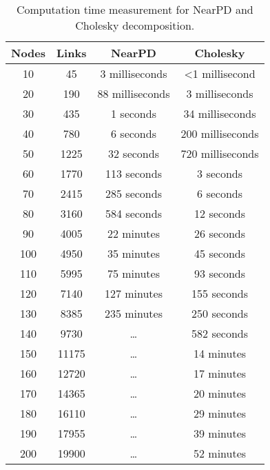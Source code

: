 \begin{table}[H]
    \centering
    \begin{tabular}{|c|c|c|c|}
        \hline
        Nodes & Links & NearPD          & Cholesky                 \\\hline
        10    & 45    & 3 milliseconds  & \textless{}1 millisecond \\\hline
        20    & 190   & 88 milliseconds & 3 milliseconds           \\\hline
        30    & 435   & 1 seconds       & 34 milliseconds          \\\hline
        40    & 780   & 6 seconds       & 200 milliseconds         \\\hline
        50    & 1225  & 32 seconds      & 720 milliseconds         \\\hline
        60    & 1770  & 113 seconds     & 3 seconds                \\\hline
        70    & 2415  & 285 seconds     & 6 seconds                \\\hline
        80    & 3160  & 584 seconds     & 12 seconds               \\\hline
        90    & 4005  & 22 minutes      & 26 seconds               \\\hline
        100   & 4950  & 35 minutes      & 45 seconds               \\\hline
        110   & 5995  & 75 minutes      & 93 seconds               \\\hline
        120   & 7140  & 127 minutes     & 155 seconds              \\\hline
        130   & 8385  & 235 minutes     & 250 seconds              \\\hline
        140   & 9730  & \dots           & 582 seconds              \\\hline
        150   & 11175 & \dots           & 14 minutes               \\\hline
        160   & 12720 & \dots           & 17 minutes               \\\hline
        170   & 14365 & \dots           & 20 minutes               \\\hline
        180   & 16110 & \dots           & 29 minutes               \\\hline
        190   & 17955 & \dots           & 39 minutes               \\\hline
        200   & 19900 & \dots           & 52 minutes               \\\hline
    \end{tabular}
    \caption{Computation time measurement for NearPD and Cholesky decomposition.}
    \label{table:cholesky:spdtime}
\end{table}




